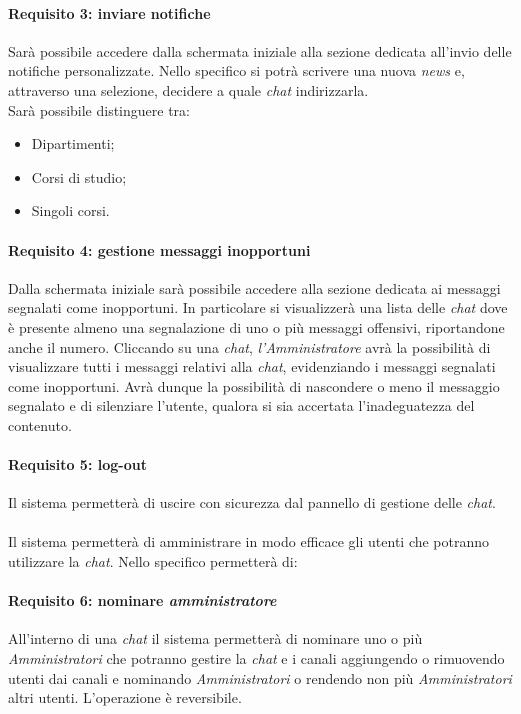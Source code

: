 \paragraph{Requisito 3: inviare notifiche\\} 
Sarà possibile accedere dalla schermata iniziale alla sezione dedicata all’invio delle notifiche personalizzate. Nello specifico si potrà scrivere una nuova \emph{news} e, attraverso una selezione, decidere a quale \emph{chat} indirizzarla.\\
Sarà possibile distinguere tra: 
\begin{itemize}
	\item Dipartimenti;
	\item Corsi di studio;
	\item Singoli corsi. 
\end{itemize}

\paragraph{Requisito 4: gestione messaggi inopportuni\\}
Dalla schermata iniziale sarà possibile accedere alla sezione dedicata ai messaggi segnalati come inopportuni.
In particolare si visualizzerà una lista delle \emph{chat} dove è presente almeno una segnalazione di uno o più messaggi offensivi, riportandone anche il numero. Cliccando su una \emph{chat}, \emph{l’Amministratore} avrà la possibilità di visualizzare tutti i messaggi relativi alla \emph{chat}, evidenziando i messaggi segnalati come inopportuni. Avrà dunque la possibilità di nascondere o meno il messaggio segnalato e di silenziare l’utente, qualora si sia accertata l’inadeguatezza del contenuto.

\paragraph{Requisito 5: log-out\\}
Il sistema permetterà di uscire con sicurezza dal pannello di gestione delle \emph{chat}.\\
\\
Il sistema permetterà di amministrare in modo efficace gli utenti che potranno utilizzare la \emph{chat}. Nello specifico permetterà di:

\paragraph{Requisito 6: nominare \emph{amministratore}\\}
All’interno di una \emph{chat} il sistema permetterà di nominare uno o più \emph{Amministratori} che potranno gestire la \emph{chat} e i canali aggiungendo o rimuovendo utenti dai canali e nominando \emph{Amministratori} o rendendo non più \emph{Amministratori} altri utenti. L’operazione è reversibile.

